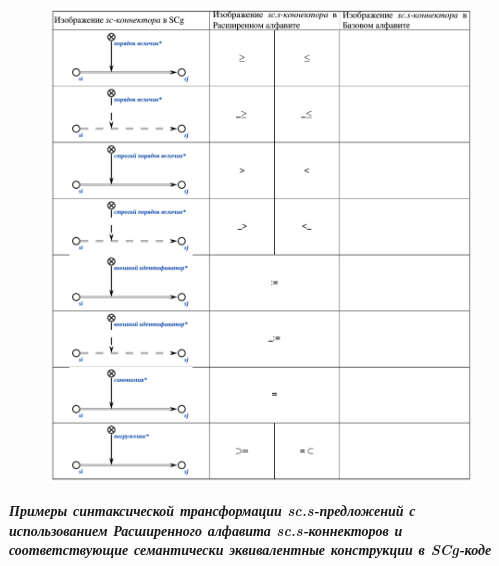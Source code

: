 \begin{figure}[h]
	\centering
	\includegraphics[scale=0.5]{images/intro/scs_non_membership_connectors_2.png}
\end{figure}

\newpage
\textbf{\textit{Примеры синтаксической трансформации sc.s-предложений с использованием Расширенного алфавита sc.s-коннекторов и соответствующие семантически эквивалентные конструкции в SCg-коде}}

\begin{SCn}
\begin{scnindent}
\end{scnindent}
\end{SCn}

